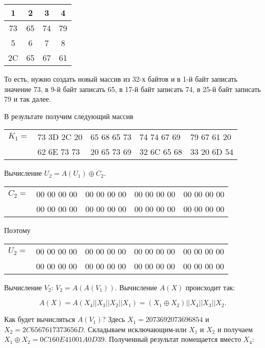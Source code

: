 \documentclass[10pt]{article}
\begin{document}
\begin{tabular}{|c|c|c|c|}
  1 & 2 & 3 & 4 \\ \hline
  73 & 65 & 74 & 79 \\ \hline
  5 & 6 & 7 & 8 \\ \hline
  2C & 65 & 67 & 61 \\ \hline
\end{tabular}

То есть, нужно создать новый массив из 32-х байтов и в 1-й байт записать значение 73, в 9-й байт записать 65, в 17-й байт записать 74, в 25-й байт записать 79 и так далее.

В результате получим следующий массив

\begin{center}
  \begin{tabular}{lllll}
    $K_1 =$ & 73 3D 2C 20 & 65 68 65 73 & 74 74 67 69 & 79 67 61 20 \\
            & 62 6E 73 73 & 20 65 73 69 & 32 6C 65 68 & 33 20 6D 54 \\
  \end{tabular}
\end{center}

Вычисление $U_2 = A(U_1) \oplus C_2$.

\begin{center}
  \begin{tabular}{lllll}
    $C_2 =$ & 00 00 00 00 & 00 00 00 00 & 00 00 00 00 & 00 00 00 00 \\
            & 00 00 00 00 & 00 00 00 00 & 00 00 00 00 & 00 00 00 00 \\
  \end{tabular}
\end{center}
    
Поэтому 
\begin{center}
  \begin{tabular}{lllll}
    $U_2 =$ & 00 00 00 00 & 00 00 00 00 & 00 00 00 00 & 00 00 00 00 \\
            & 00 00 00 00 & 00 00 00 00 & 00 00 00 00 & 00 00 00 00 \\
  \end{tabular}
\end{center}

Вычисление $V_2$: $V_2 = A(A(V_1))$. Вычисление $A(X)$ происходит так:

$$A(X) = A(X_4 || X_3 || X_2 || X_1) = (X_1 \oplus X_2) || X_4 || X_3 || X_2.$$

Как будет вычисляться $A(V_1)$? Здесь $X_1 = 20736920 73696854$ и $X_2 = 2C656761 7373656D$. Складываем исключающим-или $X_1$ и $X_2$ и получаем $X_1 \oplus X_2 = 0C160E41 001A0D39$. Полученный результат помещается вместо $X_4$:
\end{document}
